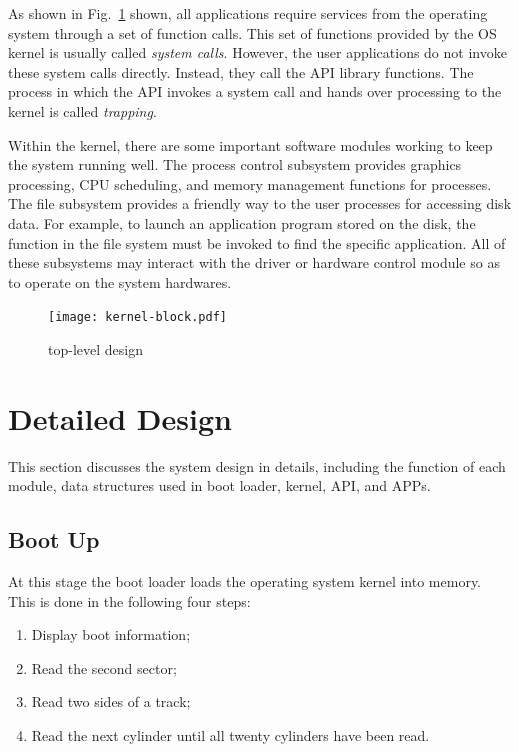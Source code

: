 \documentclass{swfcthesis}
\begin{document}
As shown in Fig.~\ref{fig:top-level} shown, all applications
require services from the
operating system through a set of function calls. This set of functions provided by the OS
kernel is usually called \emph{system calls}. However, the user applications do not invoke
these system calls directly. Instead, they call the API library functions. The process in
which the API invokes a system call and hands over processing to the kernel is called
\emph{trapping}.

Within the kernel, there are some important software modules working to keep the system
running well. The process control subsystem provides graphics processing, CPU scheduling,
and memory management functions for processes. The file
subsystem provides a friendly way to the user processes for accessing disk data. For
example, to launch an application program stored on the disk, the function in the file
system must be invoked to find the specific application. All of these subsystems may
interact with the driver or hardware control module so as to operate on the system
hardwares.

\begin{figure}%
  \centering
  \texttt{[image: kernel-block.pdf]}
  \caption{top-level design}
  \label{fig:top-level}
\end{figure}


\section{Detailed Design}
\label{sec:detailed-design}

This section discusses the system design in details, including the function of each
module, data structures used in boot loader, kernel, API, and APPs.

\subsection{Boot Up}
\label{sec:boot-up}

At this stage the boot loader loads the operating system kernel into memory. This is done
in the following four steps:
\begin{enumerate}
\item Display boot information;
\item Read the second sector;
\item Read two sides of a track;
\item Read the next cylinder until all twenty cylinders have been read.
\end{enumerate}
\end{document}
